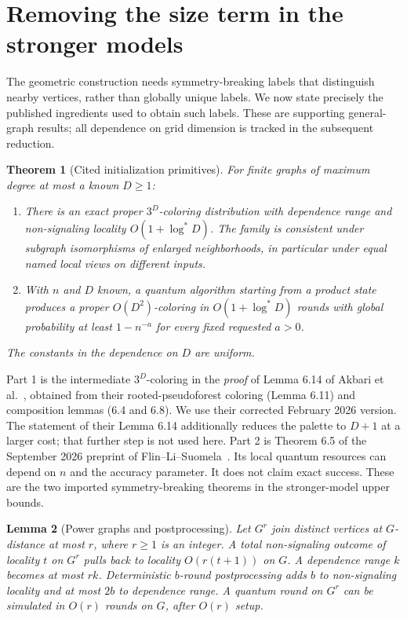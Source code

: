 \documentclass[11pt]{article}
\newtheorem{theorem}{Theorem}[section]
\newtheorem{lemma}[theorem]{Lemma}
\theoremstyle{definition}\newtheorem{definition}[theorem]{Definition}
\theoremstyle{remark}\newtheorem{remark}[theorem]{Remark}
\newcommand{\ls}{\log^*}
\begin{document}
\section{Removing the size term in the stronger models}\label{sec:transfer}

The geometric construction needs symmetry-breaking labels that
distinguish nearby vertices, rather than globally unique labels.
We now state precisely the published ingredients used to obtain
such labels. These are supporting general-graph results; all
dependence on grid dimension is tracked in the subsequent reduction.

\begin{theorem}[Cited initialization primitives]\label{thm:primitives}
For finite graphs of maximum degree at most a known $D\ge1$:
\begin{enumerate}
\item There is an exact proper $3^D$-coloring distribution with
dependence range and non-signaling locality $O(1+\ls D)$.
The family is consistent under subgraph isomorphisms of enlarged
neighborhoods, in particular under equal named local views on
different inputs.
\item With $n$ and $D$ known, a quantum algorithm starting from a
product state produces a proper $O(D^2)$-coloring in
$O(1+\ls D)$ rounds with global probability at least $1-n^{-a}$
for every fixed requested $a>0$.
\end{enumerate}
The constants in the dependence on $D$ are uniform.
\end{theorem}

Part 1 is the intermediate $3^D$-coloring in the \emph{proof} of
Lemma 6.14 of Akbari et al.~\cite{OnlineQuantum}, obtained from
their rooted-pseudoforest coloring (Lemma 6.11) and composition
lemmas (6.4 and 6.8). We use their corrected February 2026 version.
The statement of their Lemma 6.14 additionally reduces the palette
to $D+1$ at a larger cost; that further step is not used here.
Part 2 is Theorem 6.5 of the September 2026 preprint of
Flin--Li--Suomela~\cite{QuantumBreak}. Its local quantum resources
can depend on $n$ and the accuracy parameter. It does not claim
exact success. These are the two imported symmetry-breaking
theorems in the stronger-model upper bounds.

\begin{lemma}[Power graphs and postprocessing]\label{lem:power}
Let $G^r$ join distinct vertices at $G$-distance at most $r$, where
$r\ge1$ is an integer. A total non-signaling outcome of locality
$t$ on $G^r$ pulls back to locality $O(r(t+1))$ on $G$.
A dependence range $k$ becomes at most $rk$.
Deterministic $b$-round postprocessing adds $b$ to non-signaling
locality and at most $2b$ to dependence range.
A quantum round on $G^r$ can be simulated in $O(r)$ rounds on
$G$, after $O(r)$ setup.
\end{lemma}
\end{document}
